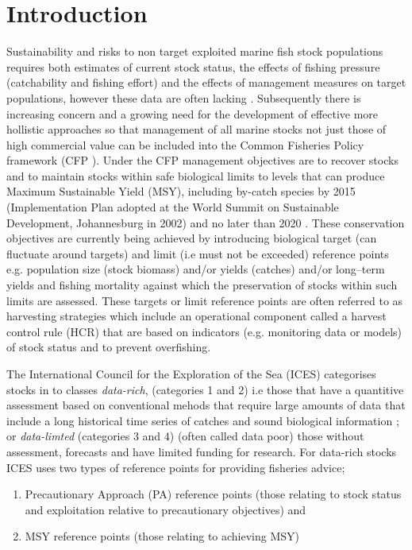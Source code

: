 \documentclass[preprint,review,12pt]{elsarticle}
\begin{document}
\section{Introduction}
\label{S:1}
Sustainability and risks to non target exploited marine fish stock populations requires both estimates of current stock status, the effects of fishing pressure (catchability and fishing effort) and the effects of management measures on target populations, however these data are often lacking \cite{doi:10.1016/j.icesjms.2006.03.028}.  Subsequently there is increasing concern and a growing need for the development of effective more hollistic approaches so that management of all marine stocks not just those of high commercial value can be included into the Common Fisheries Policy framework (CFP \cite{european2013regulation}). Under the CFP management objectives are to recover stocks and to maintain stocks within safe biological limits to levels that can produce Maximum Sustainable Yield (MSY), including by-catch species by 2015 (Implementation Plan adopted at the World Summit on Sustainable Development, Johannesburg in 2002) and no later than 2020 \cite{summit2002world} \cite{fao2003world}. These conservation objectives are currently being achieved by introducing biological target (can fluctuate around targets) and limit (i.e must not be exceeded) reference points e.g. population size (stock biomass) and/or yields (catches) and/or long–term yields and fishing mortality against which the preservation of stocks within such limits are assessed. These targets or limit reference points are often referred to as harvesting strategies which include an operational component called a harvest control rule (HCR) that are based on indicators (e.g. monitoring data or models) of stock status and to prevent overfishing. 

The International Council for the Exploration of the Sea (ICES) categorises stocks in to classes \emph{data-rich}, (categories 1 and 2) i.e those that have a quantitive assessment based on conventional mehods that require large amounts of data that include a long historical time series of catches and sound biological information \cite{bentley2015data}; or \emph{data-limted} \cite{costello2012status}(categories 3 and 4) (often called data poor) those without assessment, forecasts and have limited funding for research. For data-rich stocks ICES uses two types of reference points for providing fisheries advice; 

\begin{enumerate}
  \item Precautionary Approach (PA) reference points (those relating to stock status and exploitation relative to precautionary objectives) and 
  \item MSY reference points (those relating to achieving MSY) 
\end{enumerate}
\end{document}
